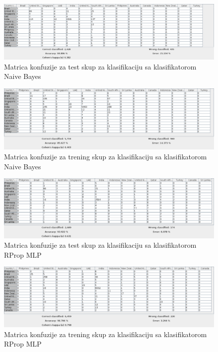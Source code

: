 \documentclass[11pt]{article} %
\begin{document}
\newline
\begin{figure}[h!]
	\centering
	\includegraphics[width=1.1\textwidth]{countryClassificationTest/NaiveBayes}
	\caption{Matrica konfuzije za test skup za klasifikaciju sa klasifikatorom Naive Bayes}
\end{figure}
\begin{figure}[h!]
	\centering
	\includegraphics[width=1.1\textwidth]{countryClassificationTraining/NaiveBayes}
	\caption{Matrica konfuzije za trening skup za klasifikaciju sa klasifikatorom Naive Bayes}
\end{figure}
\newline
\begin{figure}[h!]
	\centering
	\includegraphics[width=1.1\textwidth]{countryClassificationTest/RProp}
	\caption{Matrica konfuzije za test skup za klasifikaciju sa klasifikatorom RProp MLP}
\end{figure}
\begin{figure}[h!]
	\centering
	\includegraphics[width=1.1\textwidth]{countryClassificationTraining/RProp}
	\caption{Matrica konfuzije za trening skup za klasifikaciju sa klasifikatorom RProp MLP}
\end{figure}
\end{document}
